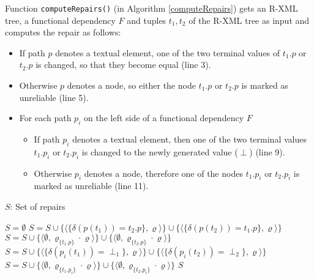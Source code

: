 Function \texttt{computeRepairs()} (in Algorithm \ref{computeRepairs}) gets an R-XML tree, a functional dependency $F$ and tuples $t_1, t_2$ of the R-XML tree as input and computes the repair as follows:
\begin{itemize}
	\item If path $p$ denotes a textual element, one of the two terminal values of $t_1.p$ or $t_2.p$ is changed, so that they become equal (line 3).
	\item Otherwise $p$ denotes a node, so either the node $t_1.p$ or $t_2.p$ is marked as unreliable (line 5).
	\item For each path $p_i$ on the left side of a functional dependency $F$
	\begin{itemize}
		\item If path $p_i$ denotes a textual element, then one of the two terminal values $t_1.p_i$ or $t_2.p_i$ is changed to the newly generated value ($\perp$) (line 9).
		\item Otherwise $p_i$ denotes a node, therefore one of the nodes $t_1.p_i$ or $t_2.p_i$ is marked as unreliable (line 11).
	\end{itemize}
\end{itemize}

\begin{algorithm}[H]
\caption{$computeRepairs(F, t_1, t_2, RXT)$}
\begin{algorithmic}[1]\label{computeRepairs}
\ENSURE $S$: Set of repairs

\STATE $S = \emptyset$
	\STATE $S = S \cup \{\langle \{\delta(p(t_1)) = t_2.p\}, \varrho \rangle\} \cup \{\langle \{\delta(p(t_2)) = t_1.p\}, \varrho \rangle\} $
\ELSE
	\STATE $S = S \cup \{\langle \emptyset, \varrho_{\{t_1.p\}} \cdot \varrho \rangle\} \cup \{\langle \emptyset, \varrho_{\{t_2.p\}} \cdot \varrho \rangle\}$
\ENDIF
{}
		\STATE $S = S \cup \{\langle \{\delta(p_i(t_1)) = \perp_1\}, \varrho \rangle\} \cup \{\langle \{\delta(p_i(t_2)) = \perp_2\}, \varrho \rangle\}$
	\ELSE
		\STATE $S = S \cup \{\langle \emptyset, \varrho_{\{t_1.p_i\}} \cdot \varrho \rangle\} \cup \{\langle \emptyset, \varrho_{\{t_2.p_i\}} \cdot \varrho \rangle\}$
	\ENDIF
\ENDFOR
\RETURN $S$
\end{algorithmic}
\end{algorithm}

